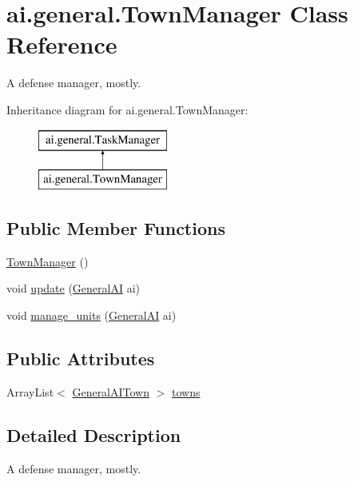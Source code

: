 \hypertarget{classai_1_1general_1_1_town_manager}{
\section{ai.general.TownManager Class Reference}
\label{classai_1_1general_1_1_town_manager}
}


A defense manager, mostly.  


Inheritance diagram for ai.general.TownManager:\begin{figure}[H]
\begin{center}
\leavevmode
\includegraphics[height=2.000000cm]{classai_1_1general_1_1_town_manager}
\end{center}
\end{figure}
\subsection*{Public Member Functions}
\begin{DoxyCompactItemize}
\item 
\hyperlink{classai_1_1general_1_1_town_manager_acb9c84feba6629bb808841aa0f12874e}{TownManager} ()
\item 
void \hyperlink{classai_1_1general_1_1_town_manager_a3817fd7714079f01a3897b6322bc45cf}{update} (\hyperlink{classai_1_1general_1_1_general_a_i}{GeneralAI} ai)
\item 
void \hyperlink{classai_1_1general_1_1_town_manager_ab76719826ebe7db01b4c49abfe819088}{manage\_\-units} (\hyperlink{classai_1_1general_1_1_general_a_i}{GeneralAI} ai)
\end{DoxyCompactItemize}
\subsection*{Public Attributes}
\begin{DoxyCompactItemize}
\item 
ArrayList$<$ \hyperlink{classai_1_1general_1_1_general_a_i_town}{GeneralAITown} $>$ \hyperlink{classai_1_1general_1_1_town_manager_ae486639caf2ee8d6cff4cf94a7d6d687}{towns}
\end{DoxyCompactItemize}


\subsection{Detailed Description}
A defense manager, mostly. 

